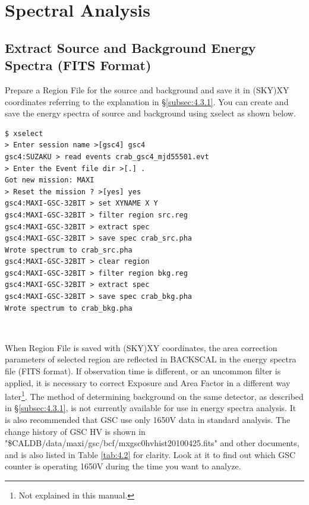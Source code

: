 \documentclass[10pt]{report}
\renewcommand{\_}{\textscale{.5}{\textbf{\textunderscore}}}
\begin{document}
\section{Spectral Analysis}\label{sec:4.4}

\subsection{Extract Source and Background Energy Spectra (FITS Format)}\label{subsec:4.4.1}

Prepare a Region File for the source and background and save it in (SKY)XY coordinates referring to the explanation in \S \ref{subsec:4.3.1}. You can create and save the energy spectra of source and background using xselect as shown below. \\

\begin{lstlisting}
$ xselect
> Enter session name >[gsc4] gsc4
gsc4:SUZAKU > read events crab_gsc4_mjd55501.evt
> Enter the Event file dir >[.] .
Got new mission: MAXI
> Reset the mission ? >[yes] yes
gsc4:MAXI-GSC-32BIT > set XYNAME X Y
gsc4:MAXI-GSC-32BIT > filter region src.reg
gsc4:MAXI-GSC-32BIT > extract spec
gsc4:MAXI-GSC-32BIT > save spec crab_src.pha
Wrote spectrum to crab_src.pha
gsc4:MAXI-GSC-32BIT > clear region
gsc4:MAXI-GSC-32BIT > filter region bkg.reg
gsc4:MAXI-GSC-32BIT > extract spec
gsc4:MAXI-GSC-32BIT > save spec crab_bkg.pha
Wrote spectrum to crab_bkg.pha
\end{lstlisting}

\

When Region File is saved with (SKY)XY coordinates, the area correction parameters of selected region are reflected in BACKSCAL in the energy spectra file (FITS format). If observation time is different, or an uncommon filter is applied, it is necessary to correct Exposure and Area Factor in a different way later\footnote{Not explained in this manual.}. The method of determining background on the same detector, as described in \S \ref{subsec:4.3.1}, is not currently available for use in energy spectra analysis. It is also recommended that GSC use only 1650V data in standard analysis. The change history of GSC HV is shown in "\$CALDB/data/maxi/gsc/bcf/mx\_gsc0\_hvhist\_20100425.fits" and other documents, and is also listed in Table \ref{tab:4.2} for clarity. Look at it to find out which GSC counter is operating 1650V during the time you want to analyze.
\end{document}
